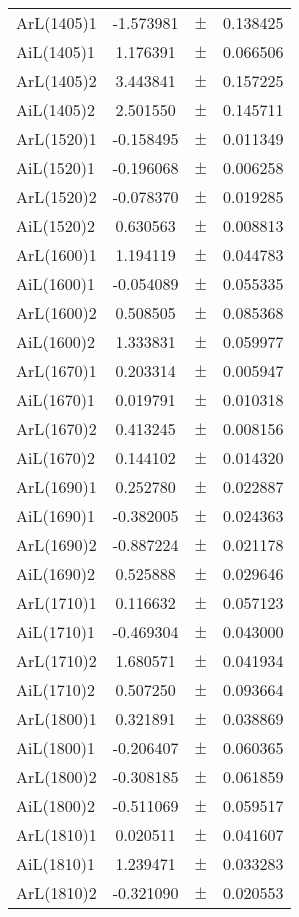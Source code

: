 \begin{table}
\begin{tiny}
\begin{tabular}{lccc}
ArL(1405)1 & -1.573981 & $\pm$ & 0.138425 \\
AiL(1405)1 & 1.176391 & $\pm$ & 0.066506 \\
ArL(1405)2 & 3.443841 & $\pm$ & 0.157225 \\
AiL(1405)2 & 2.501550 & $\pm$ & 0.145711 \\
ArL(1520)1 & -0.158495 & $\pm$ & 0.011349 \\
AiL(1520)1 & -0.196068 & $\pm$ & 0.006258 \\
ArL(1520)2 & -0.078370 & $\pm$ & 0.019285 \\
AiL(1520)2 & 0.630563 & $\pm$ & 0.008813 \\
ArL(1600)1 & 1.194119 & $\pm$ & 0.044783 \\
AiL(1600)1 & -0.054089 & $\pm$ & 0.055335 \\
ArL(1600)2 & 0.508505 & $\pm$ & 0.085368 \\
AiL(1600)2 & 1.333831 & $\pm$ & 0.059977 \\
ArL(1670)1 & 0.203314 & $\pm$ & 0.005947 \\
AiL(1670)1 & 0.019791 & $\pm$ & 0.010318 \\
ArL(1670)2 & 0.413245 & $\pm$ & 0.008156 \\
AiL(1670)2 & 0.144102 & $\pm$ & 0.014320 \\
ArL(1690)1 & 0.252780 & $\pm$ & 0.022887 \\
AiL(1690)1 & -0.382005 & $\pm$ & 0.024363 \\
ArL(1690)2 & -0.887224 & $\pm$ & 0.021178 \\
AiL(1690)2 & 0.525888 & $\pm$ & 0.029646 \\
ArL(1710)1 & 0.116632 & $\pm$ & 0.057123 \\
AiL(1710)1 & -0.469304 & $\pm$ & 0.043000 \\
ArL(1710)2 & 1.680571 & $\pm$ & 0.041934 \\
AiL(1710)2 & 0.507250 & $\pm$ & 0.093664 \\
ArL(1800)1 & 0.321891 & $\pm$ & 0.038869 \\
AiL(1800)1 & -0.206407 & $\pm$ & 0.060365 \\
ArL(1800)2 & -0.308185 & $\pm$ & 0.061859 \\
AiL(1800)2 & -0.511069 & $\pm$ & 0.059517 \\
ArL(1810)1 & 0.020511 & $\pm$ & 0.041607 \\
AiL(1810)1 & 1.239471 & $\pm$ & 0.033283 \\
ArL(1810)2 & -0.321090 & $\pm$ & 0.020553 \\

\end{tabular}
\end{tiny}
\end{table}
